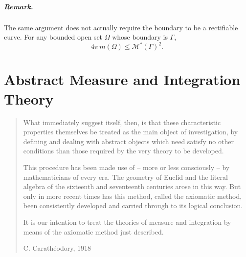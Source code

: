\documentclass[11pt,openany]{book}
\begin{document}
\paragraph{Remark.}
The same argument does not actually require the boundary to be a rectifiable curve. For any bounded open set $\Omega$ whose boundary is $\Gamma$,
\[
4\pi\,m(\Omega)\le\mathcal M^*(\Gamma)^2.
\]


\setcounter{chapter}{5}


\chapter{Abstract Measure and Integration Theory}

\begin{quote}
What immediately suggest itself, then, is that these characteristic properties themselves be treated as the main object of investigation, by defining and dealing with abstract objects which need satisfy no other conditions than those required by the very theory to be developed.

This procedure has been made use of -- more or less consciously -- by mathematicians of every era. The geometry of Euclid and the literal algebra of the sixteenth and seventeenth centuries arose in this way. But only in more recent times has this method, called the axiomatic method, been consistently developed and carried through to its logical conclusion.

It is our intention to treat the theories of measure and integration by means of the axiomatic method just described.

\hfill C. Carath\'eodory, 1918
\end{quote}
\end{document}
